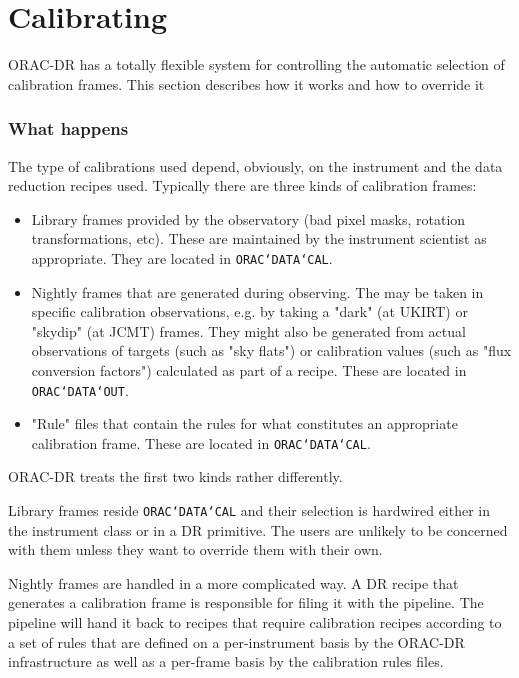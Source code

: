 \documentclass[twoside,11pt]{article}
\newcommand{\xlabel}[1]{}
\renewcommand{\_}{\texttt{\symbol{95}}}
\begin{document}
\section{Calibrating\xlabel{calibrating}}%

ORAC-DR has a totally flexible system for controlling the automatic
selection of calibration frames. This section describes how it works and
how to override it 

\subsubsection*{What happens}%

The type of calibrations used depend, obviously, on the instrument and
the data reduction recipes used. Typically there are three kinds of
calibration frames:

\begin{itemize}

\item
Library frames provided by the observatory (bad pixel masks, rotation
transformations, etc). These are maintained by the instrument
scientist as appropriate. They are located in {\tt ORAC\char`\_DATA\char`\_CAL}.

\item
Nightly frames that are generated during observing. The may be taken
in specific calibration observations, e.g. by taking a "dark" (at UKIRT)
or "skydip" (at JCMT) frames. They might also be generated from
actual observations of targets (such as "sky flats") or
calibration values (such as "flux conversion factors") calculated
as part of a recipe. These are located in {\tt ORAC\char`\_DATA\char`\_OUT}.

\item
"Rule" files that contain the rules for what constitutes an
appropriate calibration frame. These are located in {\tt ORAC\char`\_DATA\char`\_CAL}.

\end{itemize}

ORAC-DR treats the first two kinds rather differently. 

Library frames reside {\tt ORAC\char`\_DATA\char`\_CAL} and their selection is hardwired
either in the instrument class or in a DR primitive. The users are
unlikely to be concerned with them unless they want to override them
with their own.

Nightly frames are handled in a more complicated way. A DR recipe that
generates a calibration frame is responsible for filing it with the
pipeline. The pipeline will hand it back to recipes that require
calibration recipes according to a set of rules that are defined
on a per-instrument basis by the ORAC-DR infrastructure as well
as a per-frame basis by the calibration rules files.
\end{document}
